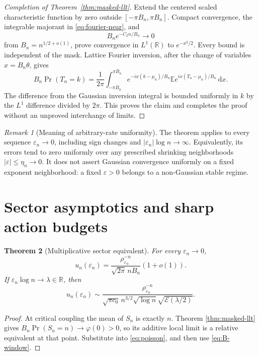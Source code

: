 \documentclass[11pt,a4paper]{article}
\numberwithin{equation}{section}
\newtheorem{theorem}{Theorem}[section]
\theoremstyle{definition}
\theoremstyle{remark}
\newtheorem{remark}[theorem]{Remark}
\newcommand{\R}{\mathbb R}
\newcommand{\E}{\mathbb E}
\newcommand{\eps}{\varepsilon}
\newcommand{\dd}{\,\mathrm d}
\newcommand{\ph}{\varphi}
\newcommand{\cE}{\mathcal E}
\begin{document}
\begin{proof}[Completion of Theorem~\ref{thm:masked-llt}]
Extend the centered scaled characteristic function by zero outside
\([ -\pi B_n,\pi B_n]\). Compact convergence, the integrable majorant in
\eqref{eq:fourier-near}, and
\[
 B_ne^{-C_2n/B_n}\longrightarrow0
\]
from \(B_n=n^{1/2+o(1)}\), prove convergence in \(L^1(\R)\) to
\(e^{-x^2/2}\). Every bound is independent of the mask. Lattice Fourier
inversion, after the change of variables \(x=B_n\theta\), gives
\[
 B_n\Pr(T_n=k)=\frac1{2\pi}\int_{-\pi B_n}^{\pi B_n}
 e^{-ix(k-\mu_n)/B_n}\E e^{ix(T_n-\mu_n)/B_n}\dd x.
\]
The difference from the Gaussian inversion integral is bounded uniformly
in \(k\) by the \(L^1\) difference divided by \(2\pi\). This proves the
claim and completes the proof without an unproved interchange of limits.
\end{proof}

\begin{remark}[Meaning of arbitrary-rate uniformity]
The theorem applies to every sequence \(\eps_n\to0\), including sign changes
and \(|\eps_n|\log n\to\infty\). Equivalently, its errors tend to zero
uniformly over any prescribed shrinking neighborhoods
\(|\eps|\le\eta_n\to0\). It does not assert Gaussian convergence uniformly
on a fixed exponent neighborhood: a fixed \(\eps>0\) belongs to a
non-Gaussian stable regime.
\end{remark}

\section{Sector asymptotics and sharp action budgets}
\label{sec:budgets}

\begin{theorem}[Multiplicative sector equivalent]
\label{thm:sectors}
For every \(\eps_n\to0\),
\begin{equation}
 u_n(\eps_n)=\frac{\rho_{\eps_n}^{-n}}{\sqrt{2\pi}\,nB_n}(1+o(1)).
 \label{eq:sectors}
\end{equation}
If \(\eps_n\log n\to\lambda\in\R\), then
\begin{equation}
 u_n(\eps_n)\sim
 \frac{\rho_{\eps_n}^{-n}}
 {\sqrt{\pi c_0}\,n^{3/2}\sqrt{\log n}\sqrt{\cE(\lambda/2)}}.
 \label{eq:sectors-window}
\end{equation}
\end{theorem}
\begin{proof}
At critical coupling the mean of \(S_n\) is exactly \(n\). Theorem
\ref{thm:masked-llt} gives \(B_n\Pr(S_n=n)\to\ph(0)>0\), so its additive
local limit is a relative equivalent at that point. Substitute into
\eqref{eq:poisson}, and then use \eqref{eq:B-window}.
\end{proof}
\end{document}
